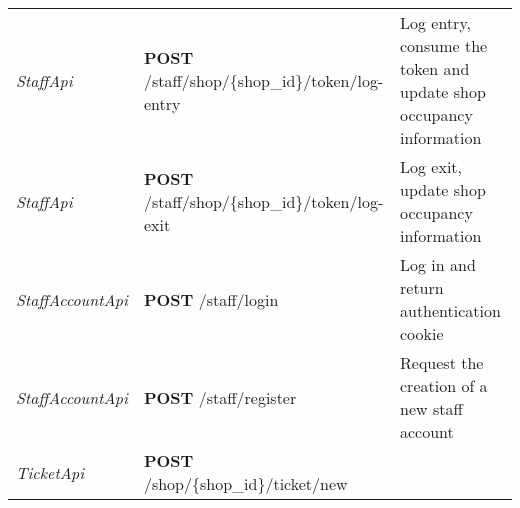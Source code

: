 \begin{longtable}[]{@{}lll@{}}
\begin{minipage}[t]{0.29\columnwidth}\raggedright
\emph{StaffApi}\strut
\end{minipage} & \begin{minipage}[t]{0.31\columnwidth}\raggedright
\textbf{POST} /staff/shop/\{shop\_id\}/token/log-entry\strut
\end{minipage} & \begin{minipage}[t]{0.31\columnwidth}\raggedright
Log entry, consume the token and update shop occupancy information\strut
\end{minipage}\tabularnewline
\begin{minipage}[t]{0.29\columnwidth}\raggedright
\emph{StaffApi}\strut
\end{minipage} & \begin{minipage}[t]{0.31\columnwidth}\raggedright
\textbf{POST} /staff/shop/\{shop\_id\}/token/log-exit\strut
\end{minipage} & \begin{minipage}[t]{0.31\columnwidth}\raggedright
Log exit, update shop occupancy information\strut
\end{minipage}\tabularnewline
\begin{minipage}[t]{0.29\columnwidth}\raggedright
\emph{StaffAccountApi}\strut
\end{minipage} & \begin{minipage}[t]{0.31\columnwidth}\raggedright
\textbf{POST} /staff/login\strut
\end{minipage} & \begin{minipage}[t]{0.31\columnwidth}\raggedright
Log in and return authentication cookie\strut
\end{minipage}\tabularnewline
\begin{minipage}[t]{0.29\columnwidth}\raggedright
\emph{StaffAccountApi}\strut
\end{minipage} & \begin{minipage}[t]{0.31\columnwidth}\raggedright
\textbf{POST} /staff/register\strut
\end{minipage} & \begin{minipage}[t]{0.31\columnwidth}\raggedright
Request the creation of a new staff account\strut
\end{minipage}\tabularnewline
\begin{minipage}[t]{0.29\columnwidth}\raggedright
\emph{TicketApi}\strut
\end{minipage} & \begin{minipage}[t]{0.31\columnwidth}\raggedright
\textbf{POST} /shop/\{shop\_id\}/ticket/new\strut

\end{minipage}
\end{longtable}
